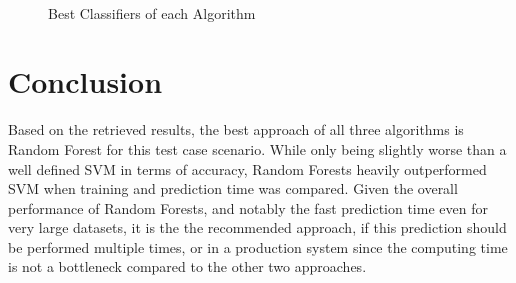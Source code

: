 \documentclass{article}[12pt]
\theoremstyle{mydef}
\begin{document}
        \begin{figure}[!h]
            \centering
            \quad
            \\
            \quad
            \caption{Best Classifiers of each Algorithm}
            \label{fig:best-classifiers}
        \end{figure}

        \section{Conclusion}

            Based on the retrieved results, the best approach of all three algorithms is Random Forest for this test case scenario. While only being slightly worse than a well defined SVM in terms of accuracy, 
            Random Forests heavily outperformed SVM when training and prediction time was compared. 
            Given the overall performance of Random Forests, and notably the fast prediction time even for very large datasets, it is the the recommended approach, if this prediction should be performed 
            multiple times, or in a production system since the computing time is not a bottleneck compared to the other two approaches.


%     
%     
\end{document}
